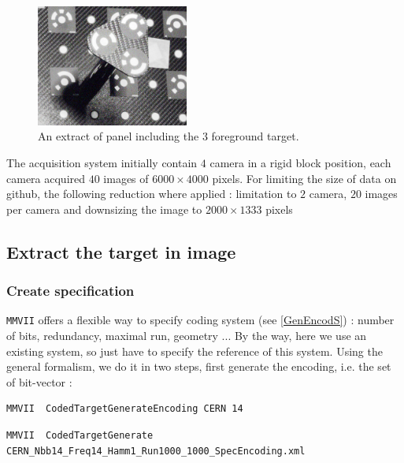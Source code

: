 \begin{figure}
\centering
	\includegraphics[width=5cm]{Tutorial/Images/Perche.jpg}
	\caption{An extract of panel including the $3$ foreground target.}
\label{fig:CodeT:Panel}
\end{figure}


The acquisition system initially contain $4$ camera in a rigid block position, each camera acquired
$40$ images of $6000 \times  4000$ pixels. For limiting the size of data on github, the following reduction
where applied : limitation to $2$ camera, $20$ images per camera and downsizing the image to $2000 \times  1333$ pixels



\subsection{Extract the target in image}


\subsubsection{Create specification}

{\tt MMVII} offers a flexible way to specify coding system (see \ref{GenEncodS}) :
number of bits, redundancy,  maximal run, geometry ... By the way, here we use
an existing system, so just have to specify the reference of this system.
Using the general formalism, we do it in two steps, first generate
the encoding, i.e. the set of bit-vector :


\begin{lstlisting}
MMVII  CodedTargetGenerateEncoding CERN 14
\end{lstlisting}

\begin{lstlisting}
MMVII  CodedTargetGenerate  CERN_Nbb14_Freq14_Hamm1_Run1000_1000_SpecEncoding.xml
\end{lstlisting}
















